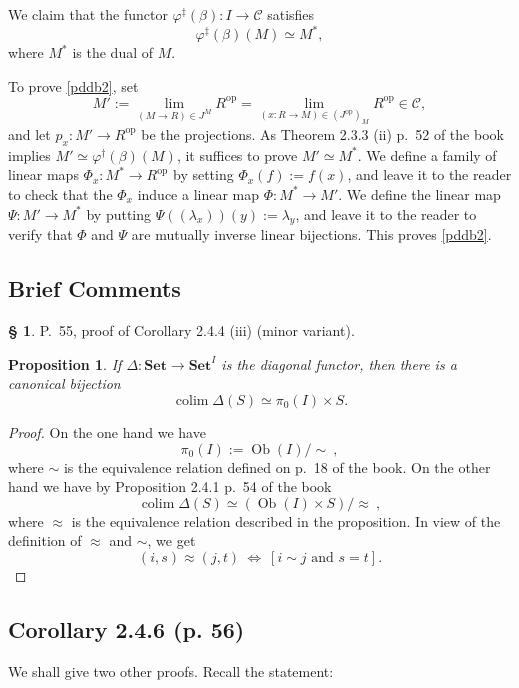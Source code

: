 \documentclass[12pt]{article}
\newtheorem{prop}[thm]{Proposition}
\theoremstyle{remark}
\theoremstyle{definition}
\newtheorem{s}[thm]{\S}
\newcommand{\C}{\mathcal C}
\newcommand{\Set}{\mathbf{Set}}
\newcommand{\pp}{\varphi}
\newcommand{\ssi}{\Leftrightarrow}
\DeclareMathOperator*{\colim}{colim}
\DeclareMathOperator{\Ob}{Ob}
\DeclareMathOperator{\op}{op}
\begin{document}
We claim that the functor $\pp^\ddagger(\beta):I\to\C$ satisfies 
%
\begin{equation}\label{pddb2}
\pp^\ddagger(\beta)(M)\simeq M^*, 
\end{equation} 
%
where $M^*$ is the dual of $M$. 

To prove \eqref{pddb2}, set 
$$
M':=\lim_{(M\to R)\in J^M}R^{\op}=\lim_{(x:R\to M)\in(J^{\op})_M}R^{\op}\in\C, 
$$ 
and let $p_x:M'\to R^{\op}$ be the projections. As Theorem 2.3.3 (ii) p.~52 of the book implies $M'\simeq\pp^\dagger(\beta)(M)$, it suffices to prove $M'\simeq M^*$. We define a family of linear maps $\Phi_x:M^*\to R^{\op}$ by setting $\Phi_x(f):=f(x)$, and leave it to the reader to check that the $\Phi_x$ induce a linear map $\Phi:M^*\to M'$. We define the linear map $\Psi:M'\to M^*$ by putting $\Psi((\lambda_x))(y):=\lambda_y$, and leave it to the reader to verify that $\Phi$ and $\Psi$ are mutually inverse linear bijections. This proves \eqref{pddb2}. 


\subsection{Brief Comments}

\begin{s} 
P.~55, proof of Corollary 2.4.4 (iii) (minor variant).
%
\begin{prop}
If $\Delta:\Set\to\Set^I$ is the diagonal functor, then there is a canonical bijection
$$
\colim\Delta(S)\simeq\pi_0(I)\times S.
$$
\end{prop} 
%
\begin{proof}
On the one hand we have 
$$
\pi_0(I):=\Ob(I)/\!\!\sim\ , 
$$
where $\sim$ is the equivalence relation defined on p.~18 of the book. On the other hand we have by Proposition 2.4.1 p.~54 of the book 
$$
\colim\Delta(S)\simeq(\Ob(I)\times S)/\!\!\approx\ ,
$$
where $\approx$ is the equivalence relation described in the proposition. In view of the definition of $\approx$ and $\sim$, we get 
$$
(i,s)\approx(j,t)\ \ssi\ [i\sim j\text{ and }s=t].
$$ 
\end{proof}
\end{s}


\subsection{Corollary 2.4.6 (p. 56)}

We shall give two other proofs. Recall the statement: 
\end{document}
